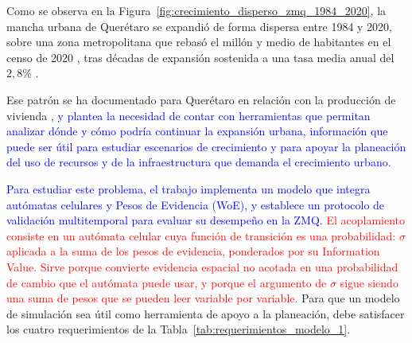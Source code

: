 Como se observa en la Figura~\ref{fig:crecimiento_disperso_zmq_1984_2020}, la mancha urbana de Querétaro se expandió de forma dispersa entre 1984 y 2020, sobre una zona metropolitana que rebasó el millón y medio de habitantes en el censo de 2020 \parencite{INEGI2020Censo}, tras décadas de expansión sostenida a una tasa media anual del $2{,}8$\% \parencite{CONAPO2018Delimitacion}.

Ese patrón se ha documentado para Querétaro en relación con la producción de vivienda \parencite{ObservatorioCiudades2022Queretaro}, \textcolor{blue}{y plantea la necesidad de contar con herramientas que permitan analizar dónde y cómo podría continuar la expansión urbana, información que puede ser útil para estudiar escenarios de crecimiento y para apoyar la planeación del uso de recursos y de la infraestructura que demanda el crecimiento urbano.}

\textcolor{blue}{Para estudiar este problema, el trabajo implementa un modelo que integra autómatas celulares y Pesos de Evidencia (WoE), y establece un protocolo de validación multitemporal para evaluar su desempeño en la ZMQ.} \textcolor{red}{El acoplamiento consiste en un autómata celular cuya función de transición es una probabilidad: $\sigma$ aplicada a la suma de los pesos de evidencia, ponderados por su Information Value. Sirve porque convierte evidencia espacial no acotada en una probabilidad de cambio que el autómata puede usar, y porque el argumento de $\sigma$ sigue siendo una suma de pesos que se pueden leer variable por variable.} Para que un modelo de simulación sea útil como herramienta de apoyo a la planeación, debe satisfacer los cuatro requerimientos de la Tabla~\ref{tab:requerimientos_modelo_1}.


